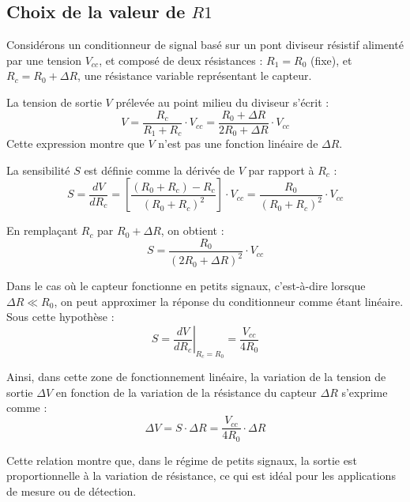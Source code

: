 \subsection{Choix de la valeur de \(R1\)}

Considérons un conditionneur de signal basé sur un pont diviseur résistif 
alimenté par une tension \( V_{cc} \), et composé de deux résistances : 
\( R_1 = R_0 \) (fixe), et \( R_c = R_0 + \Delta R \), une résistance variable 
représentant le capteur.

La tension de sortie \( V \) prélevée au point milieu du diviseur s’écrit :
\[
V = \frac{R_c}{R_1 + R_c} \cdot V_{cc} = \frac{R_0 + \Delta R}{2R_0 + \Delta R} \cdot V_{cc}
\]
Cette expression montre que \( V \) n’est pas une fonction linéaire de \( \Delta R \).


La sensibilité \( S \) est définie comme la dérivée de \( V \) par rapport à \( R_c \) :
\[
S = \frac{dV}{dR_c} = \left[ \frac{(R_0 + R_c) - R_c}{(R_0 + R_c)^2} \right] \cdot V_{cc} = \frac{R_0}{(R_0 + R_c)^2} \cdot V_{cc}
\]

En remplaçant \( R_c \) par \( R_0 + \Delta R \), on obtient :
\[
S = \frac{R_0}{(2R_0 + \Delta R)^2} \cdot V_{cc}
\]

Dans le cas où le capteur fonctionne en petits signaux, c’est-à-dire lorsque 
\( \Delta R \ll R_0 \), on peut approximer la réponse du conditionneur comme 
étant linéaire. Sous cette hypothèse :
\[
S = \left. \frac{dV}{dR_c} \right|_{R_c = R_0} = \frac{V_{cc}}{4R_0}
\]

Ainsi, dans cette zone de fonctionnement linéaire, la variation de la tension de 
sortie \( \Delta V \) en fonction de la variation de la résistance du capteur 
\( \Delta R \) s’exprime comme :
\[
\Delta V = S \cdot \Delta R = \frac{V_{cc}}{4R_0} \cdot \Delta R
\]

Cette relation montre que, dans le régime de petits signaux, la sortie est 
proportionnelle à la variation de résistance, ce qui est idéal pour les 
applications de mesure ou de détection.
